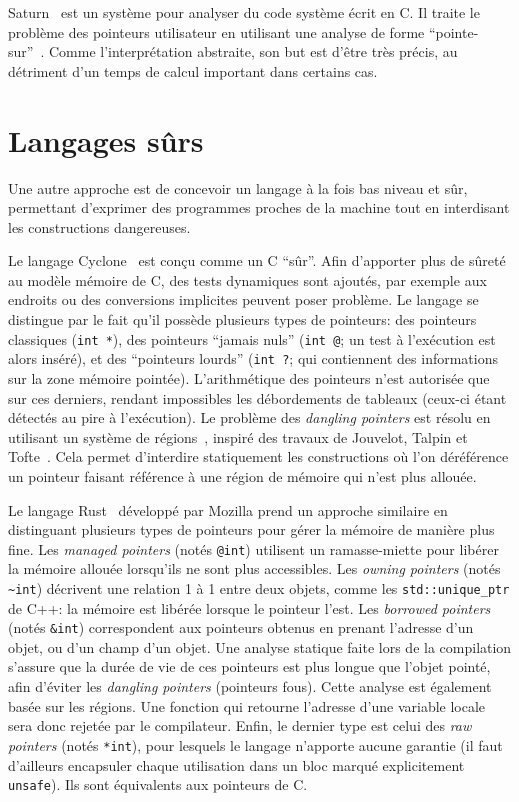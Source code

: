 Saturn~\cite{paste07} est un système pour analyser du code système écrit en C.
Il traite le problème des pointeurs utilisateur en utilisant une analyse de
forme ``pointe-sur''~\cite{oakland08}. Comme l'interprétation abstraite, son but
est d'être très précis, au détriment d'un temps de calcul important dans
certains cas.


\section{Langages sûrs}

Une autre approche est de concevoir un langage à la fois bas niveau et sûr,
permettant d'exprimer des programmes proches de la machine tout en interdisant
les constructions dangereuses.

Le langage Cyclone~\cite{cyclone-safety} est conçu comme un C ``sûr''. Afin
d'apporter plus de sûreté au modèle mémoire de C, des tests dynamiques sont
ajoutés, par exemple aux endroits ou des conversions implicites peuvent poser
problème. Le langage se distingue par le fait qu'il possède plusieurs types de
pointeurs: des pointeurs classiques (\texttt{int *}), des pointeurs ``jamais
nuls'' (\texttt{int @}; un test à l'exécution est alors inséré), et des
``pointeurs lourds'' (\verb!int ?!; qui contiennent des informations sur la zone
mémoire pointée). L'arithmétique des pointeurs n'est autorisée que sur ces
derniers, rendant impossibles les débordements de tableaux (ceux-ci étant
détectés au pire à l'exécution). Le problème des \emph{dangling pointers} est
résolu en utilisant un système de régions~\cite{cyclone-regions}, inspiré des
travaux de Jouvelot, Talpin et \linebreak Tofte~\cite{jfp92,ToTa1993,popl94}.
Cela permet d'interdire statiquement les constructions où l'on déréférence un
pointeur faisant référence à une région de mémoire qui n'est plus allouée.

Le langage Rust~ développé par Mozilla prend un approche similaire en
distinguant plusieurs types de pointeurs pour gérer la mémoire de manière plus
fine. Les \emph{managed pointers} (notés \texttt{@int}) utilisent un
ramasse-miette pour libérer la mémoire allouée lorsqu'ils ne sont plus
accessibles. Les \emph{owning pointers} (notés \texttt{\textasciitilde{}int})
décrivent une relation 1 à 1 entre deux objets, comme les
\texttt{std::unique\_ptr} de C++: la mémoire est libérée lorsque le pointeur
l'est. Les \emph{borrowed pointers} (notés \texttt{\&int}) correspondent aux
pointeurs obtenus en prenant l'adresse d'un objet, ou d'un champ d'un objet. Une
analyse statique faite lors de la compilation s'assure que la durée de vie de
ces pointeurs est plus longue que l'objet pointé, afin d'éviter les
\emph{dangling pointers} (pointeurs fous). Cette analyse est également basée sur
les régions. Une fonction qui retourne l'adresse d'une variable locale sera donc
rejetée par le compilateur. Enfin, le dernier type est celui des \emph{raw
pointers} (notés \texttt{*int}), pour lesquels le langage n'apporte aucune
garantie (il faut d'ailleurs encapsuler chaque utilisation dans un bloc marqué
explicitement \texttt{unsafe}). Ils sont équivalents aux pointeurs de C.

